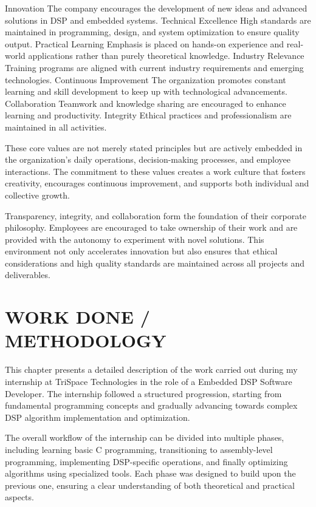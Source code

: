 \documentclass[12pt,a4paper]{report}
\begin{document}
Innovation The company encourages the development of new ideas and advanced solutions in DSP and embedded systems. Technical Excellence High standards are maintained in programming, design, and system optimization to ensure quality output. Practical Learning Emphasis is placed on hands-on experience and real-world applications rather than purely theoretical knowledge. Industry Relevance Training programs are aligned with current industry requirements and emerging technologies. Continuous Improvement The organization promotes constant learning and skill development to keep up with technological advancements. Collaboration Teamwork and knowledge sharing are encouraged to enhance learning and productivity. Integrity Ethical practices and professionalism are maintained in all activities.

These core values are not merely stated principles but are actively embedded in the organization's daily operations, decision-making processes, and employee interactions. The commitment to these values creates a work culture that fosters creativity, encourages continuous improvement, and supports both individual and collective growth.


Transparency, integrity, and collaboration form the foundation of their corporate philosophy. Employees are encouraged to take ownership of their work and are provided with the autonomy to experiment with novel solutions. This environment not only accelerates innovation but also ensures that ethical considerations and high quality standards are maintained across all projects and deliverables.




\chapter{WORK DONE / METHODOLOGY}
\label{ch:work}


This chapter presents a detailed description of the work carried out during my internship at TriSpace Technologies in the role of a Embedded DSP Software Developer. The internship followed a structured progression, starting from fundamental programming concepts and gradually advancing towards complex DSP algorithm implementation and optimization.


The overall workflow of the internship can be divided into multiple phases, including learning basic C programming, transitioning to assembly-level programming, implementing DSP-specific operations, and finally optimizing algorithms using specialized tools. Each phase was designed to build upon the previous one, ensuring a clear understanding of both theoretical and practical aspects.
\end{document}

